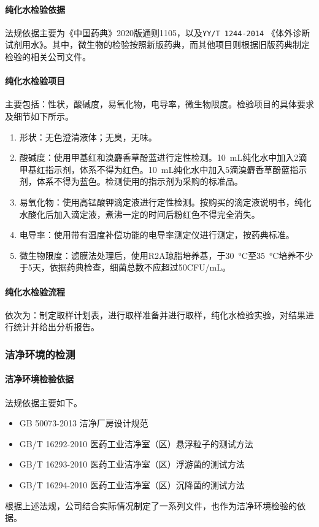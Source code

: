 \paragraph{纯化水检验依据} 法规依据主要为《中国药典》2020版通则1105，以及\texttt{YY/T 1244-2014} 《体外诊断试剂用水》。其中，微生物的检验按照新版药典，而其他项目则根据旧版药典制定检验的相关公司文件。

\paragraph{纯化水检验项目} 主要包括：性状，酸碱度，易氧化物，电导率，微生物限度。检验项目的具体要求及细节如下所示。
\begin{enumerate}
    \item 形状：无色澄清液体；无臭，无味。
    \item 酸碱度：使用甲基红和溴麝香草酚蓝进行定性检测。\SI{10}{\milli\liter}纯化水中加入2滴甲基红指示剂，体系不得为红色。\SI{10}{\milli\liter}纯化水中加入5滴溴麝香草酚蓝指示剂，体系不得为蓝色。检测使用的指示剂为采购的标准品。
    \item 易氧化物：使用高锰酸钾滴定液进行定性检测。按购买的滴定液说明书，纯化水酸化后加入滴定液，煮沸一定的时间后粉红色不得完全消失。
    \item 电导率：使用带有温度补偿功能的电导率测定仪进行测定，按药典标准。
    \item 微生物限度：滤膜法处理后，使用R2A琼脂培养基，于\SI{30}{\celsius}至\SI{35}{\celsius}培养不少于5天，依据药典检查，细菌总数不应超过50CFU/mL。
\end{enumerate}

\paragraph{纯化水检验流程} 依次为：制定取样计划表，进行取样准备并进行取样，纯化水检验实验，对结果进行统计并给出分析报告。

\subsubsection{洁净环境的检测}
\paragraph{洁净环境检验依据} 法规依据主要如下。
\begin{itemize}
    \item GB 50073-2013 洁净厂房设计规范
    \item GB/T 16292-2010 医药工业洁净室（区）悬浮粒子的测试方法
    \item GB/T 16293-2010 医药工业洁净室（区）浮游菌的测试方法
    \item GB/T 16294-2010 医药工业洁净室（区）沉降菌的测试方法
\end{itemize}
根据上述法规，公司结合实际情况制定了一系列文件，也作为洁净环境检验的依据。

